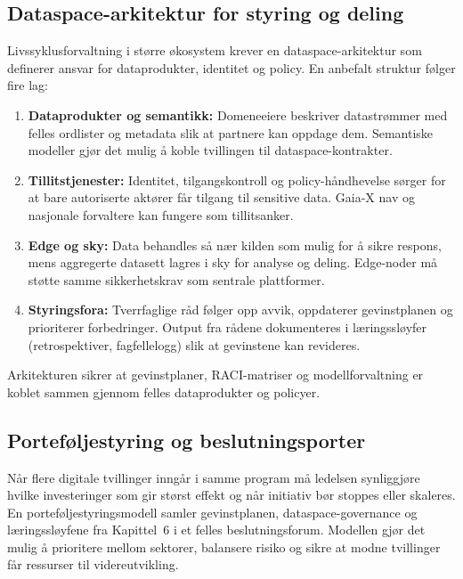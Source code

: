 \subsection*{Dataspace-arkitektur for styring og deling}
Livssyklusforvaltning i større økosystem krever en dataspace-arkitektur som definerer ansvar for dataprodukter, identitet og policy. En anbefalt struktur følger fire lag:
\begin{enumerate}
    \item \textbf{Dataprodukter og semantikk:} Domeneeiere beskriver datastrømmer med felles ordlister og metadata slik at partnere kan oppdage dem. Semantiske modeller gjør det mulig å koble tvillingen til dataspace-kontrakter.\citep{idsa2023ram}
    \item \textbf{Tillitstjenester:} Identitet, tilgangskontroll og policy-håndhevelse sørger for at bare autoriserte aktører får tilgang til sensitive data. Gaia-X nav og nasjonale forvaltere kan fungere som tillitsanker.\citep{gaiax2023architecture}
    \item \textbf{Edge og sky:} Data behandles så nær kilden som mulig for å sikre respons, mens aggregerte datasett lagres i sky for analyse og deling. Edge-noder må støtte samme sikkerhetskrav som sentrale plattformer.\citep{etsi2023mec}
    \item \textbf{Styringsfora:} Tverrfaglige råd følger opp avvik, oppdaterer gevinstplanen og prioriterer forbedringer. Output fra rådene dokumenteres i læringssløyfer (retrospektiver, fagfellelogg) slik at gevinstene kan revideres.
\end{enumerate}
Arkitekturen sikrer at gevinstplaner, RACI-matriser og modellforvaltning er koblet sammen gjennom felles dataprodukter og policyer.

\subsection*{Porteføljestyring og beslutningsporter}
Når flere digitale tvillinger inngår i samme program må ledelsen synliggjøre hvilke investeringer som gir størst effekt og når initiativ bør stoppes eller skaleres. En porteføljestyringsmodell samler gevinstplanen, dataspace-governance og læringssløyfene fra Kapittel~6 i et felles beslutningsforum.\citep{digdir2022gevinst,rcn2024digitalisering} Modellen gjør det mulig å prioritere mellom sektorer, balansere risiko og sikre at modne tvillinger får ressurser til videreutvikling.

